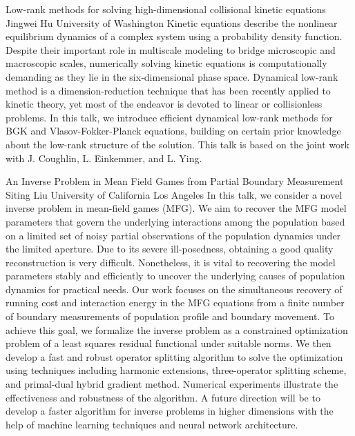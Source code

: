 \begin{addmargin}[2em]{0em}
\vspace{1.5ex}
\abs
{Low-rank methods for solving high-dimensional collisional kinetic equations}
{Jingwei Hu}
{University of Washington}
{Kinetic equations describe the nonlinear equilibrium dynamics of a complex system using a probability density function. Despite their important role in multiscale modeling to bridge microscopic and macroscopic scales, numerically solving kinetic equations is computationally demanding as they lie in the six-dimensional phase space. Dynamical low-rank method is a dimension-reduction technique that has been recently applied to kinetic theory, yet most of the endeavor is devoted to linear or collisionless problems. In this talk, we introduce efficient dynamical low-rank methods for BGK and Vlasov-Fokker-Planck equations, building on certain prior knowledge about the low-rank structure of the solution. This talk is based on the joint work with J. Coughlin, L. Einkemmer, and L. Ying.}


\vspace{1.5ex}
\abs
{An Inverse Problem in Mean Field Games from Partial Boundary Measurement}
{Siting Liu}
{University of California Los Angeles}
{In this talk, we consider a novel inverse problem in mean-field games (MFG). We aim to recover the MFG model parameters that govern the underlying interactions among the population based on a limited set of noisy partial observations of the population dynamics under the limited aperture. Due to its severe ill-posedness, obtaining a good quality reconstruction is very difficult. Nonetheless, it is vital to recovering the model parameters stably and efficiently to uncover the underlying causes of population dynamics for practical needs.
	Our work focuses on the simultaneous recovery of running cost and interaction energy in the MFG equations from a finite number of boundary measurements of population profile and boundary movement. To achieve this goal, we formalize the inverse problem as a constrained optimization problem of a least squares residual functional under suitable norms. We then develop a fast and robust operator splitting algorithm to solve the optimization using techniques including harmonic extensions, three-operator splitting scheme, and primal-dual hybrid gradient method. Numerical experiments illustrate the effectiveness and robustness of the algorithm.
	A future direction will be to develop a faster algorithm for inverse problems in higher dimensions with the help of machine learning techniques and neural network architecture.}



\end{addmargin}
